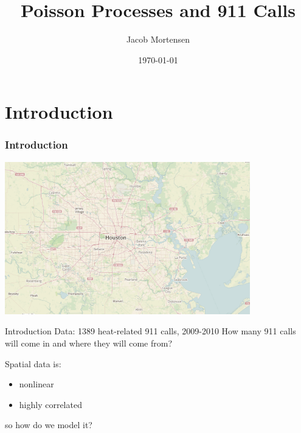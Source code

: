 \documentclass[10pt, compress]{beamer}
\title{Poisson Processes and 911 Calls}
\subtitle{}
\date{\today}
\author{Jacob Mortensen}
\institute{Brigham Young University}
\begin{document}
  \maketitle
  
  \section{Introduction}
  \begin{frame}
    \frametitle{Introduction}
    \centering
    \includegraphics[width=0.8\textwidth]{houston_map.jpg}
  \end{frame}
  \begin{frame}{Introduction}
    Data: 1389 heat-related 911 calls, 2009-2010 \newline
    \newline
    How many 911 calls will come in and where they will come from? \newline

    \centering
    \begin{minipage}{0.8\textwidth}
      Spatial data is:
      \begin{itemize}
        \item nonlinear
        \item highly correlated
      \end{itemize}
    so how do we model it?
    \end{minipage}
  \end{frame}
\end{document}
